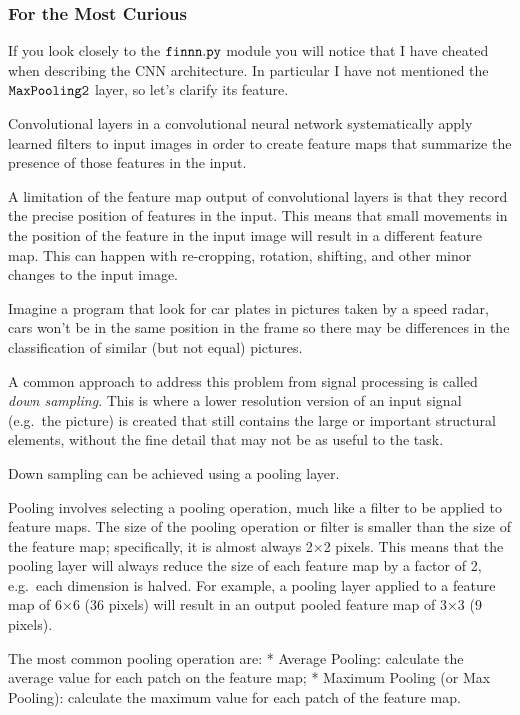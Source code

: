 \begin{codebox}[breakable, size=fbox, boxrule=1pt, pad at break*=1mm, colframe=cellborder, colback=cream]
\subsubsection{For the Most Curious}\label{for-the-most-curious}

If you look closely to the \(\tt{finnn.py}\) module you will notice that
I have cheated when describing the CNN architecture. In particular I
have not mentioned the \(\tt{MaxPooling2}\) layer, so let's clarify its
feature.

Convolutional layers in a convolutional neural network systematically
apply learned filters to input images in order to create feature maps
that summarize the presence of those features in the input.

A limitation of the feature map output of convolutional layers is that
they record the precise position of features in the input. This means
that small movements in the position of the feature in the input image
will result in a different feature map. This can happen with
re-cropping, rotation, shifting, and other minor changes to the input
image.

Imagine a program that look for car plates in pictures taken by a speed
radar, cars won't be in the same position in the frame so there may be
differences in the classification of similar (but not equal) pictures.

A common approach to address this problem from signal processing is
called \emph{down sampling}. This is where a lower resolution version of
an input signal (e.g.~the picture) is created that still contains the
large or important structural elements, without the fine detail that may
not be as useful to the task.

Down sampling can be achieved using a pooling layer.

Pooling involves selecting a pooling operation, much like a filter to be
applied to feature maps. The size of the pooling operation or filter is
smaller than the size of the feature map; specifically, it is almost
always 2×2 pixels. This means that the pooling layer will always reduce
the size of each feature map by a factor of 2, e.g.~each dimension is
halved. For example, a pooling layer applied to a feature map of 6×6 (36
pixels) will result in an output pooled feature map of 3×3 (9 pixels).

The most common pooling operation are: * Average Pooling: calculate the
average value for each patch on the feature map; * Maximum Pooling (or
Max Pooling): calculate the maximum value for each patch of the feature
map.
\end{codebox}

